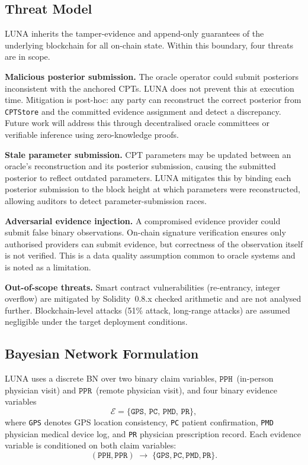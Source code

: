 \documentclass[journal]{IEEEtran}
\begin{document}
\subsection{Threat Model}

LUNA inherits the tamper-evidence and append-only
guarantees of the underlying blockchain for all
on-chain state. Within this boundary, four threats
are in scope.

\textbf{Malicious posterior submission.}
The oracle operator could submit posteriors inconsistent
with the anchored CPTs. LUNA does not prevent this at
execution time. Mitigation is post-hoc: any party can
reconstruct the correct posterior from \texttt{CPTStore}
and the committed evidence assignment and detect a
discrepancy. Future work will address this through
decentralised oracle committees or verifiable inference
using zero-knowledge proofs.

\textbf{Stale parameter submission.}
CPT parameters may be updated between an oracle's
reconstruction and its posterior submission, causing
the submitted posterior to reflect outdated parameters.
LUNA mitigates this by binding each posterior submission
to the block height at which parameters were
reconstructed, allowing auditors to detect
parameter-submission races.

\textbf{Adversarial evidence injection.}
A compromised evidence provider could submit false
binary observations. On-chain signature verification
ensures only authorised providers can submit evidence,
but correctness of the observation itself is not
verified. This is a data quality assumption common to
oracle systems and is noted as a limitation.

\textbf{Out-of-scope threats.}
Smart contract vulnerabilities (re-entrancy, integer
overflow) are mitigated by Solidity~0.8.x checked
arithmetic and are not analysed further.
Blockchain-level attacks (51\% attack, long-range
attacks) are assumed negligible under the target
deployment conditions.

\subsection{Bayesian Network Formulation}

LUNA uses a discrete BN over two binary claim
variables, $\texttt{PPH}$~(in-person physician visit)
and $\texttt{PPR}$~(remote physician visit), and four
binary evidence variables
\[
  \mathcal{E}=\{
    \texttt{GPS},\,\texttt{PC},\,
    \texttt{PMD},\,\texttt{PR}
  \},
\]
where \texttt{GPS} denotes GPS location consistency,
\texttt{PC} patient confirmation, \texttt{PMD}
physician medical device log, and \texttt{PR}
physician prescription record.
Each evidence variable is conditioned on both claim
variables:
\[
  (\texttt{PPH},\texttt{PPR})
  \;\rightarrow\;
  \{\texttt{GPS},\texttt{PC},\texttt{PMD},\texttt{PR}\}.
\]
\end{document}

